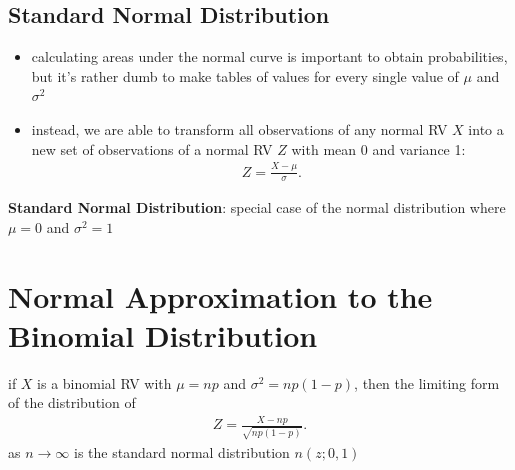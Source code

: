 \documentclass[10pt]{article}
\begin{document}
\subsection{Standard Normal Distribution}
\begin{itemize}
    \item calculating areas under the normal curve is important to obtain probabilities, but it's rather dumb to make tables of values for every single value of $\mu$ and $\sigma^2$
    \item instead, we are able to transform all observations of any normal RV $X$ into a new set of observations of a normal RV $Z$ with mean 0 and variance 1:
         \begin{gather*}
            Z = \frac{X-\mu}{\sigma}
        .\end{gather*}
\end{itemize}
\begin{definition}
    \textbf{Standard Normal Distribution}: special case of the normal distribution where $\mu=0$ and $\sigma^2 = 1$ 
\end{definition}

\section{Normal Approximation to the Binomial Distribution}
\begin{theorem}
    if $X$ is a binomial RV with $\mu = np$ and $\sigma^2 = np(1-p)$, then the limiting form of the distribution of
     \begin{gather*}
        Z = \frac{X-np}{\sqrt{np(1-p)}}
    .\end{gather*}
    as $n \to \infty$ is the standard normal distribution $n(z;0,1)$
\end{theorem}
\end{document}
